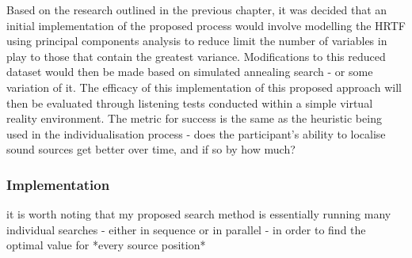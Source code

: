 Based on the research outlined in the previous chapter, it was decided that an initial implementation of the proposed process would involve modelling the HRTF using principal components analysis to reduce limit the number of variables in play to those that contain the greatest variance. Modifications to this reduced dataset would then be made based on simulated annealing search - or some variation of it. The efficacy of this implementation of this proposed approach will then be evaluated through listening tests conducted within a simple virtual reality environment. The metric for success is the same as the heuristic being used in the individualisation process - does the participant's ability to localise sound sources get better over time, and if so by how much?

\subsubsection{Implementation}

it is worth noting that my proposed search method is essentially running many individual searches - either in sequence or in parallel - in order to find the optimal value for *every source position*